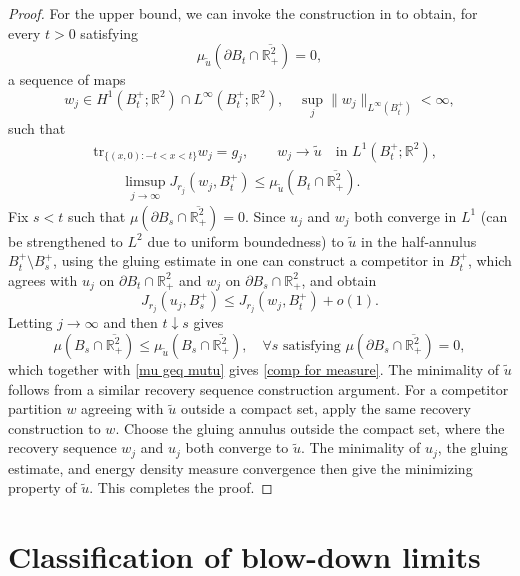 \documentclass[leqno,11pt]{amsart}
\let\pa=\partial
\let\pa=\partial
\theoremstyle{remark}
\newcommand{\BR}{\mathbb{R}}
\begin{document}
\begin{proof}
For the upper bound, we can invoke the construction in \cite[proof of Theorem 1.1]{gazoulis} to obtain, for every $t>0$ satisfying
\begin{equation*}
    \mu_{\tilde{u}}(\pa B_t\cap \overline{\BR_+^2})=0,
\end{equation*}
a sequence of maps
\begin{equation*}
    w_j \in H^1(B_t^+;\BR^2)\cap L^\infty(B_t^+;\BR^2),\quad \sup_j \|w_j\|_{L^\infty(B_t^+)}<\infty,
\end{equation*}
such that 
\begin{align*}
    &\mathrm{tr}_{\{(x,0):-t<x<t\}} w_j=g_j,\qquad w_j\to \tilde{u} \quad \text{in }L^1(B_t^+;\BR^2),\\
    &\qquad \limsup\limits_{j\to\infty} J_{r_j}(w_j, B_t^+)\leq \mu_{\tilde{u}}(B_t\cap \overline{\BR^2_+}).
\end{align*}
Fix $s<t$ such that $\mu(\pa B_s\cap \overline{\BR_+^2})=0$. Since $u_j$ and $w_j$ both converge in $L^1$ (can be strengthened to $L^2$ due to uniform boundedness) to $\tilde{u}$ in the half-annulus $B_t^+\setminus B_s^+$, using the gluing estimate in \cite[Lemma 2.1]{gazoulis} one can construct a competitor in $B_t^+$, which agrees with $u_j$ on $\pa B_t\cap \BR^2_+$ and $w_j$ on $\pa B_s\cap\BR^2_+$, and obtain
\begin{equation*}
    J_{r_j}(u_j,B_s^+)\leq J_{r_j}(w_j,B_t^+)+o(1).
\end{equation*}
Letting $j\to\infty$ and then $t\downarrow s$ gives 
\[
\mu (B_s\cap\overline{\BR_+^2})\leq \mu_{\tilde{u}}(B_s\cap\overline{\BR_+^2}), \quad \forall s\text{ satisfying }\mu(\pa B_s\cap \overline{\BR_+^2})=0,
\]
which together with \eqref{mu geq mutu} gives \eqref{comp for measure}. The minimality of $\tilde{u}$ follows from a similar recovery sequence construction argument. For a competitor partition $w$ agreeing with $\tilde{u}$ outside a compact set, apply the same recovery construction to $w$. Choose the gluing annulus outside the compact set, where the recovery sequence $w_j$ and $u_j$ both converge to $\tilde{u}$. The minimality of $u_j$, the gluing estimate, and energy density measure convergence then give the minimizing property of $\tilde{u}$. This completes the proof.
    
\end{proof}


\section{Classification of blow-down limits}\label{sec:classification}
\end{document}
